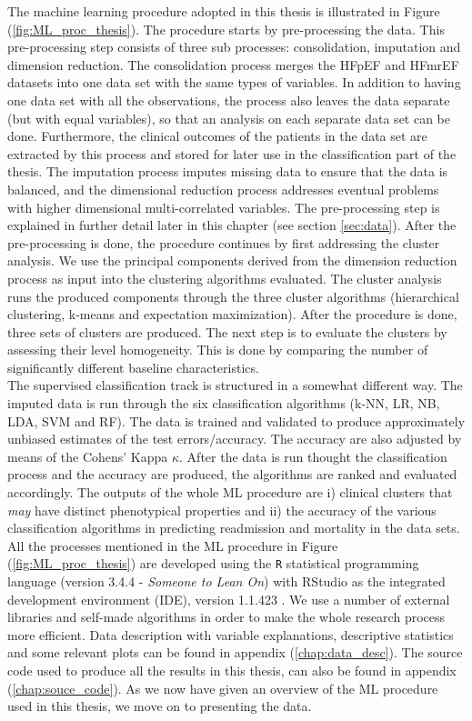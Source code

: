 \documentclass[../thesis.tex]{subfiles}
\begin{document}


\indent The machine learning procedure adopted in this thesis is illustrated in Figure (\ref{fig:ML_proc_thesis}). The procedure starts by pre-processing the data. This pre-processing step consists of three sub processes: consolidation, imputation and dimension reduction. The consolidation process merges the HFpEF and HFmrEF datasets into one data set with the same types of variables. In addition to having one data set with all the observations, the process also leaves the data separate (but with equal variables), so that an analysis on each separate data set can be done. Furthermore, the clinical outcomes of the patients in the data set are extracted by this process and stored for later use in the classification part of the thesis. The imputation process imputes missing data to ensure that the data is balanced, and the dimensional reduction process addresses eventual problems with higher dimensional multi-correlated variables. The pre-processing step is explained in further detail later in this chapter (see section \ref{sec:data}). After the pre-processing is done, the procedure continues by first addressing the cluster analysis. We use the principal components derived from the dimension reduction process as input into the clustering algorithms evaluated. The cluster analysis runs the produced components through the three cluster algorithms (hierarchical clustering, k-means and expectation maximization). After the procedure is done, three sets of clusters are produced. The next step is to evaluate the clusters by assessing their level homogeneity. This is done by comparing the number of significantly different baseline characteristics.\\
\indent The supervised classification track is structured in a somewhat different way. The imputed data is run through the six classification algorithms (k-NN, LR, NB, LDA, SVM and RF). The data is trained and validated to produce approximately unbiased estimates of the test errors/accuracy. The accuracy are also adjusted by means of the Cohens' Kappa $\kappa$. After the data is run thought the classification process and the accuracy are produced, the algorithms are ranked and evaluated accordingly. The outputs of the whole ML procedure are i) clinical clusters that \textit{may} have distinct phenotypical properties and ii) the accuracy of the various classification algorithms in predicting readmission and mortality in the data sets. All the processes mentioned in the ML procedure in Figure (\ref{fig:ML_proc_thesis}) are developed using the \texttt{R} statistical programming language (version 3.4.4 - \textit{Someone to Lean On}) \citep{Rsoftware2018} with RStudio as the integrated development environment (IDE), version 1.1.423 \citep{RStudio2018}. We use a number of external libraries and self-made algorithms in order to make the whole research process more efficient. Data description with variable explanations, descriptive statistics and some relevant plots can be found in appendix (\ref{chap:data_desc}). The source code used to produce all the results in this thesis, can also be found in appendix (\ref{chap:souce_code}). As we now have given an overview of the ML procedure used in this thesis, we move on to presenting the data.
\end{document}
